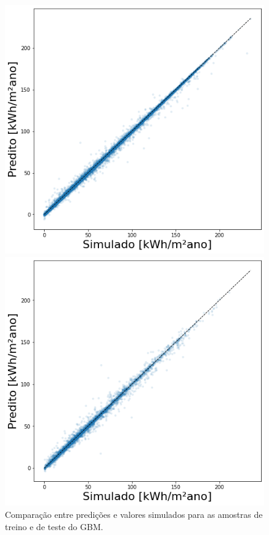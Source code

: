 \documentclass{article}
\begin{document}
\begin{figure}[!htb]
	\caption{Comparação entre predições e valores simulados para as amostras de treino e de teste do GBM.} %
	\label{fig:scattertrain}
	\centering
	\begin{minipage}{.5\textwidth}
		\centering
		\includegraphics[width=\linewidth]{scatter_train.png}
	\end{minipage}%
	\begin{minipage}{.5\textwidth}
		\centering
		\includegraphics[width=\linewidth]{scatter_test.png}
	\end{minipage}
\end{figure}
\end{document}
